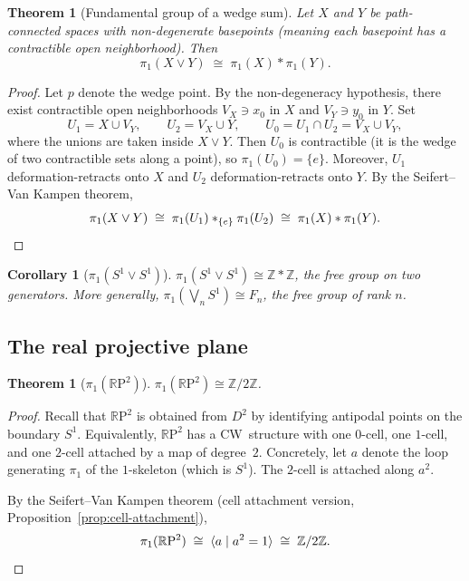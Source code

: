 \documentclass[12pt,a4paper,openany]{book}
\theoremstyle{definition}
\theoremstyle{plain}
\newtheorem{theorem}[definition]{Theorem}
\newtheorem{corollary}[definition]{Corollary}
\theoremstyle{remark}
\newcommand{\Z}{\mathbb{Z}}
\newcommand{\RP}{\mathbb{R}\mathrm{P}}
\begin{document}
\begin{theorem}[Fundamental group of a wedge sum]\label{thm:pi1-wedge}
  Let $X$ and $Y$ be path-connected spaces with non-degenerate basepoints
  (meaning each basepoint has a contractible open neighborhood).  Then
  \[
    \pi_1(X \vee Y) \;\cong\; \pi_1(X) * \pi_1(Y).
  \]
\end{theorem}

\begin{proof}
  Let $p$ denote the wedge point.  By the non-degeneracy hypothesis, there
  exist contractible open neighborhoods $V_X \ni x_0$ in $X$ and
  $V_Y \ni y_0$ in $Y$.  Set
  \[
    U_1 = X \cup V_Y, \qquad U_2 = V_X \cup Y, \qquad U_0 = U_1 \cap U_2 = V_X \cup V_Y,
  \]
  where the unions are taken inside $X \vee Y$.  Then $U_0$ is contractible
  (it is the wedge of two contractible sets along a point), so
  $\pi_1(U_0) = \{e\}$.  Moreover, $U_1$ deformation-retracts onto $X$ and
  $U_2$ deformation-retracts onto $Y$.  By the Seifert--Van Kampen theorem,
  \[
    \pi_1(X \vee Y) \;\cong\; \pi_1(U_1) *_{\{e\}} \pi_1(U_2) \;\cong\;
    \pi_1(X) * \pi_1(Y). \qedhere
  \]
\end{proof}

\begin{corollary}[$\pi_1(S^1 \vee S^1)$]\label{cor:pi1-bouquet}
  $\pi_1(S^1 \vee S^1) \cong \Z * \Z$, the free group on two generators.
  More generally, $\pi_1\!\left(\bigvee_{n} S^1\right) \cong F_n$, the free
  group of rank $n$.
\end{corollary}

\subsection{The real projective plane}\label{subsec:RP2}

\begin{theorem}[$\pi_1(\RP^2)$]\label{thm:pi1-RP2}
  $\pi_1(\RP^2) \cong \Z/2\Z$.
\end{theorem}

\begin{proof}
  Recall that $\RP^2$ is obtained from $D^2$ by identifying antipodal points
  on the boundary $S^1$.  Equivalently, $\RP^2$ has a CW~structure with one
  $0$-cell, one $1$-cell, and one $2$-cell attached by a map of degree~$2$.
  Concretely, let $a$ denote the loop generating $\pi_1$ of the $1$-skeleton
  (which is $S^1$).  The $2$-cell is attached along $a^2$.

  By the Seifert--Van Kampen theorem (cell attachment version,
  Proposition~\ref{prop:cell-attachment}),
  \[
    \pi_1(\RP^2) \;\cong\; \langle a \mid a^2 = 1 \rangle \;\cong\; \Z/2\Z. \qedhere
  \]
\end{proof}
\end{document}
